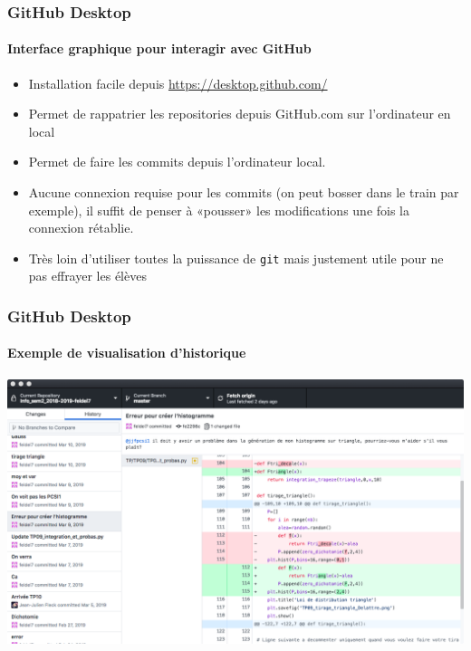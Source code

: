 \begin{frame}
	\frametitle{GitHub Desktop}
	\framesubtitle{Interface graphique pour interagir avec GitHub}

	\begin{itemize}[<+->]
		\item Installation facile depuis \url{https://desktop.github.com/}

		\item Permet de rappatrier les repositories depuis GitHub.com sur l'ordinateur en local

		\item Permet de faire les commits depuis l'ordinateur local.

		\item Aucune connexion requise pour les commits (on peut bosser dans le train par exemple), il suffit de penser à «pousser» les modifications une fois la connexion rétablie.

		\item Très loin d'utiliser toutes la puissance de \texttt{git} mais justement utile pour ne pas effrayer les élèves

	\end{itemize}

\end{frame}

\begin{frame}
	\frametitle{GitHub Desktop}
	\framesubtitle{Exemple de visualisation d'historique}

	\begin{center}
		\includegraphics[width=\linewidth]{figures/githubdesktop.png}
	\end{center}

\end{frame}

